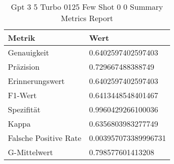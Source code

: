 
    \begin{table}[!ht]
        \centering
        \begin{tabularx}{\textwidth}{X l}
\toprule
\textbf{Metrik} & \textbf{Wert} \\
\midrule
Genauigkeit & \num{0.6402597402597403} \\
Präzision & \num{0.729667488388749} \\
Erinnerungswert & \num{0.6402597402597403} \\
F1-Wert & \num{0.6413448548401467} \\
Spezifität & \num{0.9960429266100036} \\
Kappa & \num{0.6356803983277749} \\
Falsche Positive Rate & \num{0.003957073389996731} \\
G-Mittelwert & \num{0.798577601413208} \\
\bottomrule
\end{tabularx}

        \caption{Gpt 3 5 Turbo 0125 Few Shot 0 0 Summary Metrics Report}
        \label{tab:gpt-3-5-turbo-0125-few-shot-0-0-summary-metrics-report}
    \end{table}
    